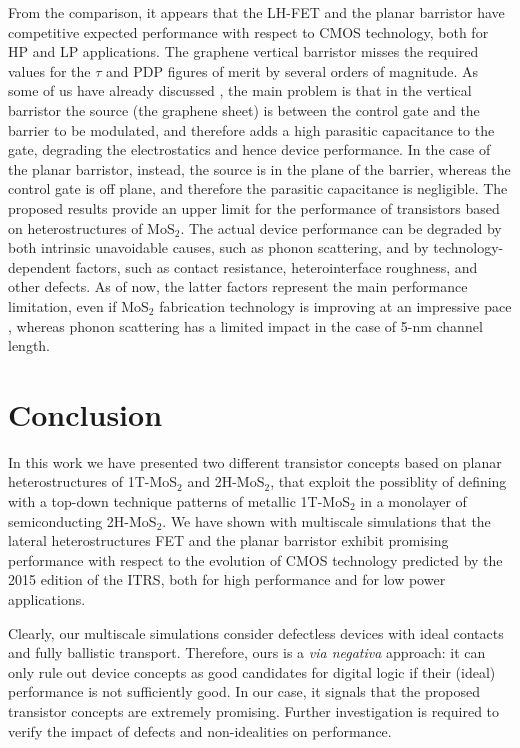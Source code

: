 \documentclass[aps,reprint,superscriptaddress,secnumarabic,amssymb,showpacs]{revtex4-1}
\begin{document}
From the comparison, it appears that the LH-FET and the planar barristor have competitive expected performance with respect to CMOS technology, both for HP and LP applications. The graphene vertical barristor misses the required values for the $\tau$ and PDP figures of merit by several orders of magnitude. As some of us have already discussed \cite{Logoteta2014}, the main problem is that in the vertical barristor the source (the graphene sheet) is between the control gate and the barrier to be modulated, and therefore adds a high parasitic capacitance to the gate, degrading the electrostatics and hence device performance. In the case of the planar barristor, instead, the source is in the plane of the barrier, whereas the control gate is off plane, and therefore the parasitic capacitance is negligible. The proposed results provide an upper limit for the performance of transistors based on heterostructures of MoS$_2$. The actual device performance can be degraded by both intrinsic unavoidable causes, such as phonon scattering, and by technology-dependent factors, such as contact resistance, heterointerface roughness, and  other defects. As of now, the latter factors represent the main performance limitation, even if MoS$_2$ fabrication technology is improving at an impressive pace \cite{Kappera2014,Kappera2014_2,Nourbakhsh2016}, whereas phonon scattering has a limited impact in the case of 5-nm channel length.

\section{Conclusion}

In this work we have presented two different transistor concepts based on planar heterostructures of 1T-MoS$_2$ and 2H-MoS$_2$, that exploit the possiblity of defining with a top-down technique patterns of metallic 1T-MoS$_2$ in a monolayer of semiconducting 2H-MoS$_2$. We have shown with multiscale simulations that the lateral heterostructures FET and the planar barristor exhibit promising performance with respect to the  evolution of CMOS technology predicted by the 2015 edition of the ITRS, both for high performance and for low power applications.

Clearly, our multiscale simulations consider defectless devices with ideal contacts and fully ballistic transport. Therefore, ours is a {\em via negativa} approach: it can only rule out device concepts as good candidates for digital logic if their (ideal) performance is not sufficiently good. 
In our case, it signals that the proposed transistor concepts are extremely promising. Further investigation is required to verify the impact of defects and non-idealities on performance.
\end{document}
